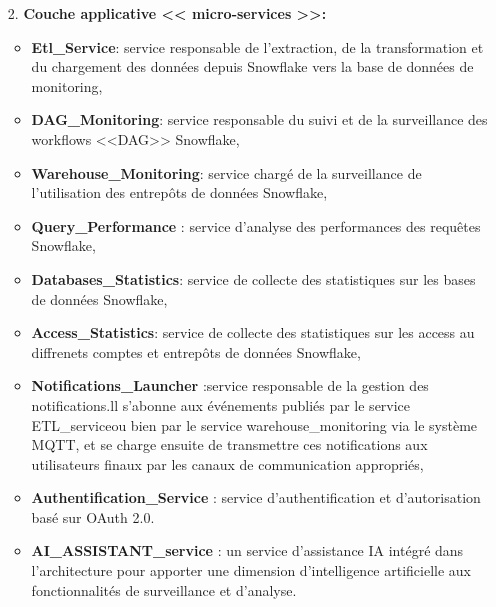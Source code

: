 \begin{enumerate}
         \item[2.] \textbf{Couche applicative << micro-services >>:}
                \begin{itemize}
                \item \textbf{Etl\_Service}: service responsable de l'extraction, de la transformation et du chargement des données depuis Snowflake vers la base de données de monitoring,
                \item \textbf{DAG\_Monitoring}: service responsable du suivi et de la surveillance des workflows <<DAG>> Snowflake,
                \item \textbf{Warehouse\_Monitoring}: service chargé de la surveillance de l'utilisation des entrepôts de données Snowflake,
                \item \textbf{Query\_Performance }: service d'analyse des performances des requêtes Snowflake,
                \item \textbf{ Databases\_Statistics}: service de collecte des statistiques sur les bases de données Snowflake,
                \item \textbf{Access\_Statistics}: service de collecte des statistiques sur les access au diffrenets comptes et entrepôts de données Snowflake,
                \item \textbf{Notifications\_Launcher }:service responsable de la gestion des notifications.ll s'abonne aux événements publiés par le service ETL\_serviceou bien par le service warehouse\_monitoring via le système MQTT, et se charge ensuite de transmettre ces notifications aux utilisateurs finaux par les canaux de communication appropriés,
                \item \textbf{Authentification\_Service }: service d'authentification et d'autorisation basé sur OAuth 2.0.
                \item \textbf{AI\_ASSISTANT\_service }: un service d'assistance IA intégré dans l'architecture pour apporter une dimension d'intelligence artificielle aux fonctionnalités de surveillance et d'analyse.


\end{itemize}
\end{enumerate}
